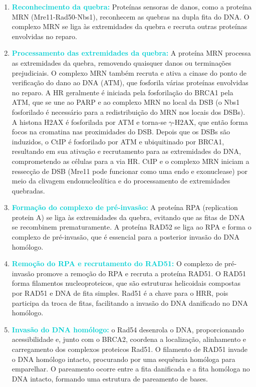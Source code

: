 \documentclass[11pt,a4paper]{article}
\begin{document}
	\begin{enumerate}[label=\textcolor{CarnationPink}{\arabic*${}^\circ $}]
		\item \textcolor{DarkTurquoise}{\textbf{Reconhecimento da quebra:}} Proteínas sensoras de danos, como a proteína MRN (Mre11-Rad50-Nbs1), reconhecem as quebras na dupla fita do DNA. O complexo MRN se liga às extremidades da quebra e recruta outras proteínas envolvidas no reparo. 
		\item \textcolor{DarkTurquoise}{\textbf{Processamento das extremidades da quebra:}} A proteína MRN processa as extremidades da quebra, removendo quaisquer danos ou terminações prejudiciais. O complexo MRN também recruta e ativa a cinase do ponto de verificação do dano ao DNA (ATM), que fosforila várias proteínas envolvidas no reparo. A HR geralmente é iniciada pela fosforilação do BRCA1 pela ATM, que se une ao PARP e ao complexo MRN no local da DSB (o Nbs1 fosforilado é necessário para a redistribuição do MRN nos locais dos DSBs). A histona H2AX é fosforilada por ATM e torna-se $\gamma$-H2AX, que então forma focos na cromatina nas proximidades do DSB. Depois que os DSBs são induzidos, o CtIP é fosforilado por ATM e ubiquitinado por BRCA1, resultando em sua ativação e recrutamento para as extremidades do DNA, comprometendo as células para a via HR. CtIP e o complexo MRN iniciam a ressecção de DSB (Mre11 pode funcionar como uma endo e exonuclease) por meio da clivagem endonucleolítica e do processamento de extremidades quebradas.
		\item \textcolor{DarkTurquoise}{\textbf{Formação do complexo de pré-invasão:}} A proteína RPA (replication protein A) se liga às extremidades da quebra, evitando que as fitas de DNA se recombinem prematuramente. A proteína RAD52 se liga ao RPA e forma o complexo de pré-invasão, que é essencial para a posterior invasão do DNA homólogo.
		\item \textcolor{DarkTurquoise}{\textbf{Remoção do RPA e recrutamento do RAD51:}}  O complexo de pré-invasão promove a remoção do RPA e recruta a proteína RAD51. O RAD51 forma filamentos nucleoproteicos, que são estruturas helicoidais compostas por RAD51 e DNA de fita simples. Rad51 é a chave para o HRR, pois participa da troca de fitas, facilitando a invasão do DNA danificado no DNA homólogo.
		\item \textcolor{DarkTurquoise}{\textbf{Invasão do DNA homólogo:}} o Rad54 desenrola o DNA, proporcionando acessibilidade e, junto com o BRCA2, coordena a localização, alinhamento e carregamento dos complexos proteicos Rad51. O filamento de RAD51 invade o DNA homólogo intacto, procurando por uma sequência homóloga para emparelhar. O pareamento ocorre entre a fita danificada e a fita homóloga no DNA intacto, formando uma estrutura de pareamento de bases.

\end{enumerate}
\end{document}
